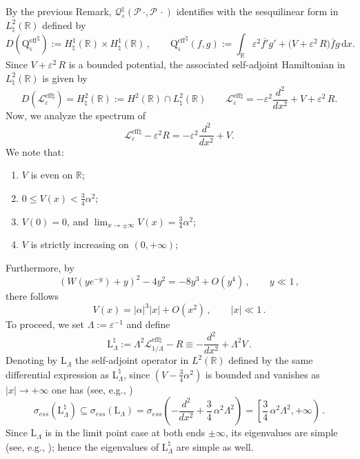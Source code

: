 \documentclass[a4paper,11pt,reqno]{amsart}
\theoremstyle{definition}
\numberwithin{equation}{section}
\newcommand{\RE}{\mathbb R}
\newcommand{\QQ}{\mathcal Q}
\newcommand{\PP}{\mathcal P}
\newcommand{\Lscr}{\mathscr{L}}
\newcommand{\Lrm}{\mathrm{L}}
\newcommand{\ve}{\varepsilon}
\renewcommand{\d}{\mathrm{d}}
\newcommand{\Qeff}{\mathrm{Q^{eff}_\ve}}
\newcommand{\eff}{\mathrm{eff}}
\newcommand{\bosfer}{{\natural}}
\begin{document}
By the previous Remark, $\QQ^\bosfer_{\ve} (\PP\,\cdot, \PP\,\cdot)$ identifies with the sesquilinear  form in $L^{2}_{\bosfer}(\RE)$ defined by
\[
D(\Qeff^{\bosfer}) := H_{\bosfer}^1(\RE) \times H_{\bosfer}^1(\RE) \,,\qquad 
\Qeff ^{\bosfer} (f,g ) :=
\int_{\RE} \ve^2 \overline{f'}  g'  +  \big( V + \ve^2 \,R \big) \overline{f} g  \, \d x  .
\]
Since $ V + \ve^2 \,R$ is a bounded potential, the associated self-adjoint Hamiltonian in $L_{\bosfer}^2(\RE)$   is given by 
    \begin{equation*}%
      D(\Lscr^{\eff\bosfer}_\ve) =
       H_{\bosfer}^2(\RE):=H^{2}(\RE)\cap L^{2}_{\bosfer}(\RE)\qquad  
       \Lscr^{\eff\bosfer}_\ve  
       = -\ve^2 \frac{d^2}{dx^2}+ V + \ve^2 \,R.
    \end{equation*}
Now, we analyze the spectrum of 
\[
\Lscr^{\eff\bosfer}_\ve - \ve^2 R =  -\ve^2 \frac{d^2}{dx^2}+ V . 
\] 
We note that:
\begin{enumerate}[$(i)$]
\item $V$ is even on $\RE$;
\item $0 \leq V(x)<\frac{3 }{4}\alpha^2 $;
\item $V(0)= 0$, and $\lim_{x\to\pm\infty} V(x) = \frac{3 }{4}\alpha^2$;
\item $V$ is strictly increasing on $(0,+\infty)$;
\end{enumerate}
Furthermore, by 
\[
(W(y e^{-y})+y)^2 - 4 y^2 = - 8 y^3  + O(y^4)\,,\qquad y\ll1\,, 
\]
there follows 
\begin{equation}\label{seriesV}
V(x) =   |\alpha|^3|x|+ O(x^2)\,,\qquad |x|\ll1\,.   
\end{equation}
To proceed, we set $\Lambda := \ve^{-1}$ and define
    \begin{equation}\label{Ham}
        \Lrm_\Lambda^\bosfer:=\Lambda^2 \Lscr^{\eff\bosfer}_{1/\Lambda } - R\equiv -\frac{d^2}{dx^2} + \Lambda^2 V  \,.
    \end{equation}
Denoting by $\Lrm_\Lambda$ the self-adjoint operator in $L^{2}(\RE)$ defined by the same differential expression as $\Lrm_\Lambda^\bosfer$,  since $(V-\frac34\alpha^2)$ is bounded and vanishes as $|x|\to+\infty$ one has (see, e.g., \cite[Theorem 3.8.2]{Schechter}) 
\[
\sigma_{ess}(  \Lrm_\Lambda^\bosfer )\subseteq\sigma_{ess}(  \Lrm_\Lambda ) = 
\sigma_{ess}\!\left(-\frac{d^2}{dx^2}+\frac34\,\alpha^2\Lambda^{2}\right)= 
\left[\frac34\,\alpha^2\Lambda^2,+\infty\right)\,.
\]
Since  $\Lrm_\Lambda$ is in the limit point case at both ends $\pm\infty$, its eigenvalues are simple  (see, e.g., \cite[Section 10]{Weidmann}); hence the eigenvalues of $\Lrm_\Lambda^\bosfer$ are simple as well. \par
\end{document}
